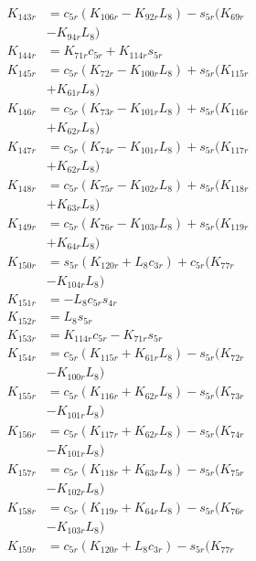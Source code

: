 \begin{multicols}{2}
\begin{align}
K_{143r} &= c_{5r}(K_{106r} - K_{92r}L_8) - s_{5r}(K_{69r}  \nonumber \\
&- K_{94r}L_8) \nonumber \\
K_{144r} &= K_{71r}c_{5r} + K_{114r}s_{5r} \nonumber \\
K_{145r} &= c_{5r}(K_{72r} - K_{100r}L_8) + s_{5r}(K_{115r}  \nonumber \\
&+ K_{61r}L_8) \nonumber \\
K_{146r} &= c_{5r}(K_{73r} - K_{101r}L_8) + s_{5r}(K_{116r}  \nonumber \\
&+ K_{62r}L_8) \nonumber \\
K_{147r} &= c_{5r}(K_{74r} - K_{101r}L_8) + s_{5r}(K_{117r}  \nonumber \\
&+ K_{62r}L_8) \nonumber \\
K_{148r} &= c_{5r}(K_{75r} - K_{102r}L_8) + s_{5r}(K_{118r}  \nonumber \\
&+ K_{63r}L_8) \nonumber \\
K_{149r} &= c_{5r}(K_{76r} - K_{103r}L_8) + s_{5r}(K_{119r}  \nonumber \\
&+ K_{64r}L_8) \nonumber \\
K_{150r} &= s_{5r}(K_{120r} + L_8c_{3r}) + c_{5r}(K_{77r}  \nonumber \\
&- K_{104r}L_8) \nonumber \\
K_{151r} &= -L_8c_{5r}s_{4r} \nonumber \\
K_{152r} &= L_8s_{5r} \nonumber \\
K_{153r} &= K_{114r}c_{5r} - K_{71r}s_{5r} \nonumber \\
K_{154r} &= c_{5r}(K_{115r} + K_{61r}L_8) - s_{5r}(K_{72r}  \nonumber \\
&- K_{100r}L_8) \nonumber \\
K_{155r} &= c_{5r}(K_{116r} + K_{62r}L_8) - s_{5r}(K_{73r}  \nonumber \\
&- K_{101r}L_8) \nonumber \\
K_{156r} &= c_{5r}(K_{117r} + K_{62r}L_8) - s_{5r}(K_{74r}  \nonumber \\
&- K_{101r}L_8) \nonumber \\
K_{157r} &= c_{5r}(K_{118r} + K_{63r}L_8) - s_{5r}(K_{75r}  \nonumber \\
&- K_{102r}L_8) \nonumber \\
K_{158r} &= c_{5r}(K_{119r} + K_{64r}L_8) - s_{5r}(K_{76r}  \nonumber \\
&- K_{103r}L_8) \nonumber \\
K_{159r} &= c_{5r}(K_{120r} + L_8c_{3r}) - s_{5r}(K_{77r}  \nonumber \\

\end{align}
\end{multicols}
